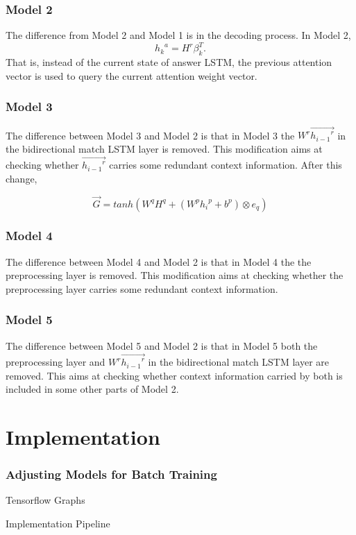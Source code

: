 \documentclass{beamer}
\begin{document}
\begin{frame} \frametitle{Model 2}
    The difference from Model 2 and Model 1 is in the decoding process. In Model 2,
    $${h_k}^a = H^r\beta _{k}^T.$$
    That is, instead of the current state of answer LSTM, the previous attention vector is used to query the current attention weight vector.
\end{frame}

\begin{frame} \frametitle{Model 3}
    The difference between Model 3 and Model 2 is that in Model 3 the $W^r\overrightarrow{{h_{i-1}}^r}$ in the bidirectional match LSTM layer is removed. This modification aims at checking whether $\overrightarrow{{h_{i-1}}^r}$ carries some redundant context information. After this change,


    $$\overrightarrow{G} = tanh(W^qH^q + (W^p{h_i}^p + b^p) \otimes e_q)$$
\end{frame}

\begin{frame} \frametitle{Model 4}
    The difference between Model 4 and Model 2 is that in Model 4 the the preprocessing layer is removed. This modification aims at checking whether the preprocessing layer carries some redundant context information.
\end{frame}

\begin{frame} \frametitle{Model 5}
    The difference between Model 5 and Model 2 is that in Model 5 both the preprocessing layer and $W^r\overrightarrow{{h_{i-1}}^r}$ in the bidirectional match LSTM layer are removed. This aims at checking whether context information carried by both is included in some other parts of Model 2.
\end{frame}

\section{Implementation}

\begin{frame} \frametitle{Adjusting Models for Batch Training}

\end{frame}


\begin{frame}{Tensorflow Graphs}

\end{frame}

\begin{frame}{Implementation Pipeline}

\end{frame}
\end{document}
